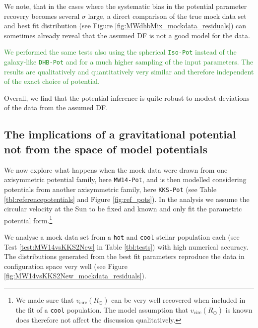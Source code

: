 \documentclass[iop,revtex4]{emulateapj}
\newcommand{\NEW}[1]{\textcolor{ForestGreen}{#1}}
\begin{document}
We note, that in the cases where the systematic bias in the potential parameter recovery becomes several $\sigma$ large, a direct comparison of the true mock data set and best fit distribution (see Figure \ref{fig:MWdhbMix_mockdata_residuals}) can sometimes already reveal that the assumed DF is not a good model for the data.

\NEW{We performed the same tests also using the spherical \texttt{Iso-Pot} instead of the galaxy-like \texttt{DHB-Pot} and for a much higher sampling of the input parameters. The results are qualitatively and quantitatively very similar and therefore independent of the exact choice of potential.}

Overall, we find that the potential inference is quite robust to modest deviations of the data from the assumed DF. 

\subsection{The implications of a gravitational potential not from the space of model potentials} \label{sec:results_potential}

We now explore what happens when the mock data were drawn from one axisymmetric potential family, here \texttt{MW14-Pot}, and is then modelled considering potentials from another axisymmetric family, here \texttt{KKS-Pot} (see Table \ref{tbl:referencepotentials} and Figure \ref{fig:ref_pots}). In the analysis we assume the circular velocity at the Sun to be fixed and known and only fit the parametric potential form.\footnote{We made sure that $v_\text{circ}(R_\odot)$ can be very well recovered when included in the fit of a \texttt{cool} population. The model assumption that $v_\text{circ}(R_\odot)$ is known does therefore not affect the discussion qualitatively.}

We analyse a mock data set from a \texttt{hot} and \texttt{cool} stellar population each (see Test \ref{test:MW14vsKKS2New} in Table \ref{tbl:tests}) with high numerical accuracy. The distributions generated from the best fit parameters reproduce the data in configuration space very well (see Figure \ref{fig:MW14vsKKS2New_mockdata_residuals}).
\end{document}
